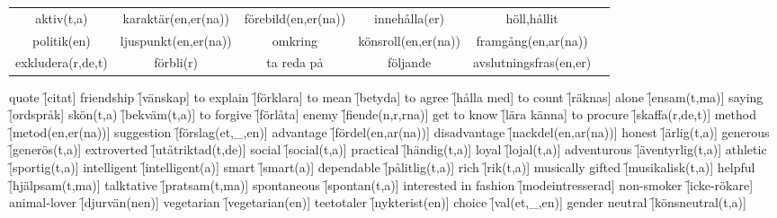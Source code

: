 \begin{center}
\begin{adjustwidth}{-2.8cm}{}
\begin{tabular}{|c c c c c c|}
            aktiv(t,a) & karaktär(en,er(na)) & förebild(en,er(na)) & innehålla(er) & höll,hållit &  \\
            politik(en) & ljuspunkt(en,er(na)) & omkring & könsroll(en,er(na)) & framgång(en,ar(na)) &  \\
            exkludera(r,de,t) & förbli(r) & ta reda på & följande & avslutningsfras(en,er) &  \\
            \hline
        \end{tabular}
    \end{adjustwidth}
\end{center}

\begin{questions}
    \begin{multicols}{2}
        \raggedcolumns
        \question quote \f[citat]
        \question friendship \f[vänskap]
        \question to explain \f[förklara]
        \question to mean \f[betyda]
        \question to agree \f[hålla med]
        \question to count \f[räknas]
        \question alone \f[ensam(t,ma)]
        \question saying \f[ordspråk]
        \question skön(t,a) \f[bekväm(t,a)]
        \question to forgive \f[förlåta]
        \question enemy \f[fiende(n,r,rna)]
        \question get to know \f[lära känna]
        \question to procure \f[skaffa(r,de,t)]
        \question method \f[metod(en,er(na))]
        \question suggestion \f[förslag(et,\_,en)]
        \question advantage \f[fördel(en,ar(na))]
        \question disadvantage \f[nackdel(en,ar(na))]
        \question honest \f[ärlig(t,a)]
        \question generous \f[generös(t,a)]
        \question extroverted \f[utåtriktad(t,de)]
        \question social \f[social(t,a)]
        \question practical \f[händig(t,a)]
        \question loyal \f[lojal(t,a)]
        \question adventurous \f[äventyrlig(t,a)]
        \question athletic \f[sportig(t,a)]
        \question intelligent \f[intelligent(a)]
        \question smart \f[smart(a)]
        \question dependable \f[pålitlig(t,a)]
        \question rich \f[rik(t,a)]
        \question musically gifted \f[musikalisk(t,a)]
        \question helpful \f[hjälpsam(t,ma)]
        \question talktative \f[pratsam(t,ma)]
        \question spontaneous \f[spontan(t,a)]
        \question interested in fashion \f[modeintresserad]
        \question non-smoker \f[icke-rökare]
        \question animal-lover \f[djurvän(nen)]
        \question vegetarian \f[vegetarian(en)]
        \question teetotaler \f[nykterist(en)]
        \question choice \f[val(et,\_,en)]
        \question gender neutral \f[könsneutral(t,a)]

\end{multicols}
\end{questions}
